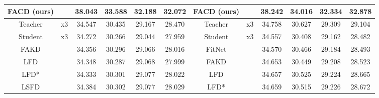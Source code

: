 \documentclass[10pt,twocolumn,letterpaper]{article}
\begin{document}
\begin{table*}[h]
{\begin{tabular}{|c|c|c|c|c|c|c|c|c|c|c|c|}
\multicolumn{1}{|c|}{FACD (ours)} &    & \multicolumn{1}{c|}{\textbf{38.043}} & \multicolumn{1}{c|}{\textbf{33.588}} & \multicolumn{1}{c|}{\textbf{32.188}} & \multicolumn{1}{c|}{\textbf{32.072}}   & \multicolumn{1}{c|}{FACD (ours)} &    & \multicolumn{1}{c|}{\textbf{38.242}} & \multicolumn{1}{c|}{\textbf{34.016}} & \multicolumn{1}{c|}{\textbf{32.334}} & \multicolumn{1}{c|}{\textbf{32.878}}   \\ \hline
\multicolumn{1}{|c|}{Teacher}     & \multicolumn{1}{c|}{x3}    & \multicolumn{1}{c|}{34.547} & \multicolumn{1}{c|}{30.435} & \multicolumn{1}{c|}{29.167} & \multicolumn{1}{c|}{28.470}   & \multicolumn{1}{c|}{Teacher}     & \multicolumn{1}{c|}{x3}    & \multicolumn{1}{c|}{34.758} & \multicolumn{1}{c|}{30.627} & \multicolumn{1}{c|}{29.309} & \multicolumn{1}{c|}{29.104}   \\ \hline
\multicolumn{1}{|c|}{Student}     & \multirow{7}{*}{x3}    & \multicolumn{1}{c|}{34.272} & \multicolumn{1}{c|}{30.266} & \multicolumn{1}{c|}{29.044} & \multicolumn{1}{c|}{27.959}   & \multicolumn{1}{c|}{Student}     & \multirow{7}{*}{x3}    & \multicolumn{1}{c|}{34.557} & \multicolumn{1}{c|}{30.408} & \multicolumn{1}{c|}{29.162} & \multicolumn{1}{c|}{28.482}   \\
\multicolumn{1}{|c|}{FAKD}        &     & \multicolumn{1}{c|}{34.356} & \multicolumn{1}{c|}{30.296} & \multicolumn{1}{c|}{29.066} & \multicolumn{1}{c|}{28.016}   & \multicolumn{1}{c|}{FitNet}      &    & \multicolumn{1}{c|}{34.570} & \multicolumn{1}{c|}{30.466} & \multicolumn{1}{c|}{29.184} & \multicolumn{1}{c|}{28.493}   \\
\multicolumn{1}{|c|}{LFD}         &    & \multicolumn{1}{c|}{34.348} & \multicolumn{1}{c|}{30.287} & \multicolumn{1}{c|}{29.068} & \multicolumn{1}{c|}{27.999}   & \multicolumn{1}{c|}{FAKD}        &    & \multicolumn{1}{c|}{34.653} & \multicolumn{1}{c|}{30.449} & \multicolumn{1}{c|}{29.208} & \multicolumn{1}{c|}{28.523}   \\
\multicolumn{1}{|c|}{LFD*}         &    & \multicolumn{1}{c|}{34.333} & \multicolumn{1}{c|}{30.301} & \multicolumn{1}{c|}{29.077} & \multicolumn{1}{c|}{28.022}   & \multicolumn{1}{c|}{LFD}         &     & \multicolumn{1}{c|}{34.657} & \multicolumn{1}{c|}{{30.525}} & \multicolumn{1}{c|}{29.224} & \multicolumn{1}{c|}{28.665}   \\
\multicolumn{1}{|c|}{LSFD}        &     & \multicolumn{1}{c|}{{34.384}} & \multicolumn{1}{c|}{{30.302}} & \multicolumn{1}{c|}{{29.077}} & \multicolumn{1}{c|}{{28.029}}   & \multicolumn{1}{c|}{LFD*}         &     & \multicolumn{1}{c|}{34.659} & \multicolumn{1}{c|}{{30.515}} & \multicolumn{1}{c|}{29.226} & \multicolumn{1}{c|}{28.672}   \\


\end{tabular}}
\end{table*}
\end{document}

